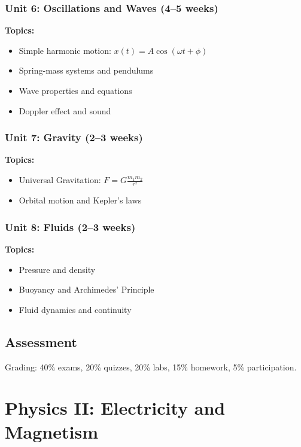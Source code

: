 \documentclass[12pt,oneside]{book}
\begin{document}
\subsection{Unit 6: Oscillations and Waves (4--5 weeks)}

\textbf{Topics:}
\begin{itemize}
    \item Simple harmonic motion: $x(t) = A\cos(\omega t + \phi)$
    \item Spring-mass systems and pendulums
    \item Wave properties and equations
    \item Doppler effect and sound
\end{itemize}

\subsection{Unit 7: Gravity (2--3 weeks)}

\textbf{Topics:}
\begin{itemize}
    \item Universal Gravitation: $F = G\frac{m_1 m_2}{r^2}$
    \item Orbital motion and Kepler's laws
\end{itemize}

\subsection{Unit 8: Fluids (2--3 weeks)}

\textbf{Topics:}
\begin{itemize}
    \item Pressure and density
    \item Buoyancy and Archimedes' Principle
    \item Fluid dynamics and continuity
\end{itemize}

\section{Assessment}

Grading: 40\% exams, 20\% quizzes, 20\% labs, 15\% homework, 5\% participation.


\chapter{Physics II: Electricity and Magnetism}
\end{document}
